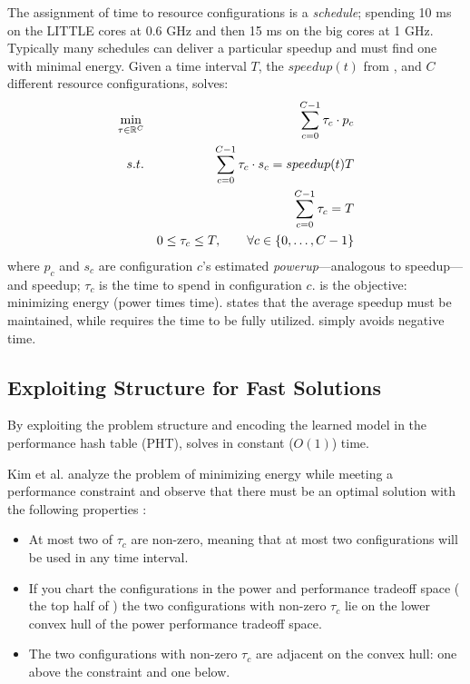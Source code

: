 The assignment of time to resource configurations is a
\emph{schedule}; \eg{} spending 10 ms on the LITTLE cores at 0.6 GHz
and then 15 ms on the big cores at 1 GHz. Typically many schedules can
deliver a particular speedup and \SYSTEM{} must find one with minimal
energy.  Given a time interval $T$, the $speedup(t)$ from
, and $C$ different resource configurations,
\SYSTEM{} solves:
\begin{eqnarray}
  \minimize_{\mathbf{\tau} \in \R^{C}} && \sum_{c=0}^{C-1} \tau_c \cdot p_c \label{eqn:power}  \\
  \st %
  && \sum_{c=0}^{C-1} \tau_c \cdot s_c =  speedup(t)T \label{eqn:work} \\
  && \sum_{c=0}^{C-1} \tau_c =  T \label{eqn:deadline} \\
  && 0 \le \tau_c \le T, \qquad \forall c \in \{0,\ldots,C-1\} \label{eqn:time}
\end{eqnarray}
where $p_c$ and $s_c$ are configuration $c$'s estimated
\emph{powerup}---analogous to speedup---and speedup; $\tau_c$ is the
time to spend in configuration $c$.   is the objective:
minimizing energy (power times time).   states that the
average speedup must be maintained, while  requires
the time to be fully utilized.   simply avoids negative
time.

\subsection{Exploiting Structure for Fast Solutions}
By exploiting the problem structure and encoding the learned model in
the performance hash table (PHT), \SYSTEM{} solves
 in constant ($O(1)$) time.

Kim et al. analyze the problem of minimizing energy while meeting a
performance constraint and observe that there must be an optimal
solution with the following properties \cite{kim-cpsna}:
\begin{itemize}[leftmargin=1em]
\item At most two of $\tau_c$ are non-zero, meaning that at most two
  configurations will be used in any time interval.
\item If you chart the configurations in the power and performance
  tradeoff space (\eg{} the top half of ) the two
  configurations with non-zero $\tau_c$ lie on the lower convex hull
  of the power performance tradeoff space.
\item The two configurations with non-zero $\tau_c$ are adjacent on
  the convex hull: one above the constraint and one below.
\end{itemize}

